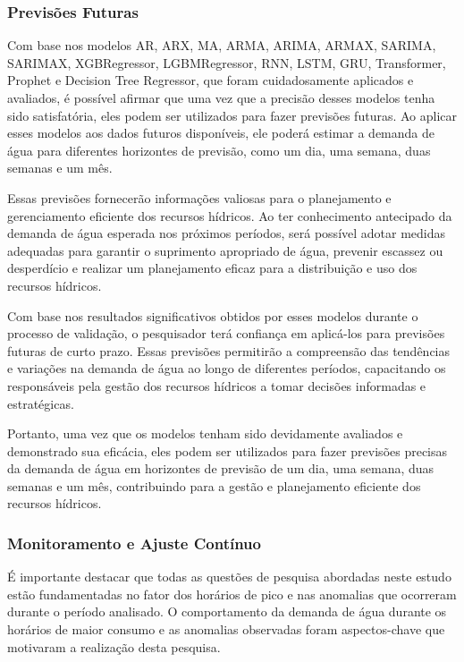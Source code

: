 \subsubsection{Previs\~oes Futuras}


Com base nos modelos AR, ARX, MA, ARMA, ARIMA, ARMAX, SARIMA, SARIMAX,  XGBRegressor, LGBMRegressor, RNN, LSTM, GRU, Transformer, Prophet e Decision Tree Regressor, que foram cuidadosamente aplicados e avaliados, é possível afirmar que uma vez que a precisão desses modelos tenha sido satisfatória, eles podem ser utilizados para fazer previsões futuras. Ao aplicar esses modelos aos dados futuros disponíveis, ele poderá estimar a demanda de água para diferentes horizontes de previsão, como um dia, uma semana, duas semanas e um mês.

Essas previsões fornecerão informações valiosas para o planejamento e gerenciamento eficiente dos recursos hídricos. Ao ter conhecimento antecipado da demanda de água esperada nos próximos períodos, será possível adotar medidas adequadas para garantir o suprimento apropriado de água, prevenir escassez ou desperdício e realizar um planejamento eficaz para a distribuição e uso dos recursos hídricos.

Com base nos resultados significativos obtidos por esses modelos durante o processo de validação, o pesquisador terá confiança em aplicá-los para previsões futuras de curto prazo. Essas previsões permitirão a compreensão das tendências e variações na demanda de água ao longo de diferentes períodos, capacitando os responsáveis pela gestão dos recursos hídricos a tomar decisões informadas e estratégicas.

Portanto, uma vez que os modelos tenham sido devidamente avaliados e demonstrado sua eficácia, eles podem ser utilizados para fazer previsões precisas da demanda de água em horizontes de previsão de um dia, uma semana, duas semanas e um mês, contribuindo para a gestão e planejamento eficiente dos recursos hídricos.

\subsubsection{Monitoramento e Ajuste Cont\'inuo}


É importante destacar que todas as questões de pesquisa abordadas neste estudo estão fundamentadas no fator dos horários de pico e nas anomalias que ocorreram durante o período analisado. O comportamento da demanda de água durante os horários de maior consumo e as anomalias observadas foram aspectos-chave que motivaram a realização desta pesquisa.

